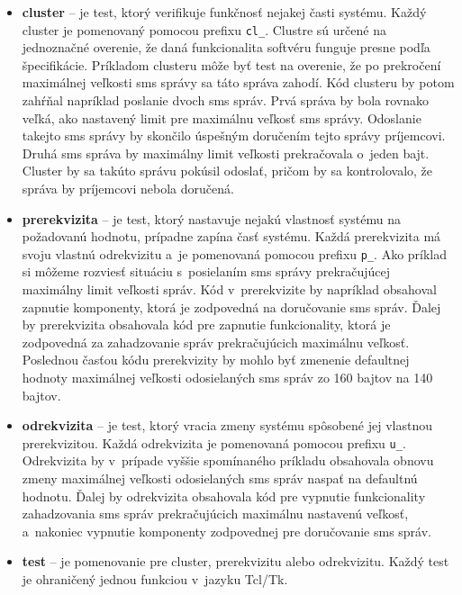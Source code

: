 \begin{itemize}
\item \textbf{cluster} -- je test, ktorý verifikuje funkčnosť nejakej 
časti systému. Každý cluster je pomenovaný pomocou prefixu \texttt{cl\_}. 
Clustre sú určené na jednoznačné overenie, že daná funkcionalita softvéru
funguje presne podľa špecifikácie. Príkladom clusteru môže byť test na
overenie, že po prekročení maximálnej veľkosti sms správy sa táto správa 
zahodí. Kód clusteru by potom zahŕňal napríklad poslanie dvoch sms správ.
Prvá správa by bola rovnako veľká, ako nastavený limit pre maximálnu 
veľkosť sms správy. 
Odoslanie takejto sms správy by skončilo úspešným doručením tejto správy
príjemcovi. 
Druhá sms správa by maximálny limit veľkosti prekračovala o~jeden bajt.
Cluster by sa takúto správu pokúsil odoslať, pričom by sa kontrolovalo,
že správa by príjemcovi nebola doručená.
\item \textbf{prerekvizita} -- je test, ktorý nastavuje nejakú vlastnosť 
systému na požadovanú hodnotu, prípadne zapína časť systému. 
Každá prerekvizita má svoju vlastnú odrekvizitu a~je pomenovaná pomocou 
prefixu \texttt{p\_}. Ako príklad si môžeme rozviesť situáciu s~posielaním
sms správy prekračujúcej maximálny limit veľkosti správ. Kód v~prerekvizite
by napríklad obsahoval zapnutie komponenty, ktorá je zodpovedná na doručovanie
sms správ. Ďalej by prerekvizita obsahovala kód pre zapnutie funkcionality,
ktorá je zodpovedná za zahadzovanie správ prekračujúcich maximálnu veľkosť.
Poslednou časťou kódu prerekvizity by mohlo byť zmenenie defaultnej hodnoty
maximálnej veľkosti odosielaných sms správ zo 160 bajtov na 140 bajtov.
\item \textbf{odrekvizita} -- je test, ktorý vracia zmeny systému 
spôsobené jej vlastnou prerekvizitou. Každá odrekvizita je pomenovaná
pomocou prefixu \texttt{u\_}. Odrekvizita by v~prípade vyššie spomínaného 
príkladu obsahovala obnovu zmeny maximálnej veľkosti odosielaných sms správ
naspať na defaultnú hodnotu. Ďalej by odrekvizita obsahovala kód pre vypnutie 
funkcionality zahadzovania sms správ prekračujúcich maximálnu nastavenú 
veľkosť, a~nakoniec vypnutie komponenty zodpovednej pre doručovanie sms 
správ.
\item \textbf{test} -- je pomenovanie pre cluster, prerekvizitu alebo 
odrekvizitu. Každý test je ohraničený jednou funkciou
v~jazyku Tcl/Tk. 

\end{itemize}

